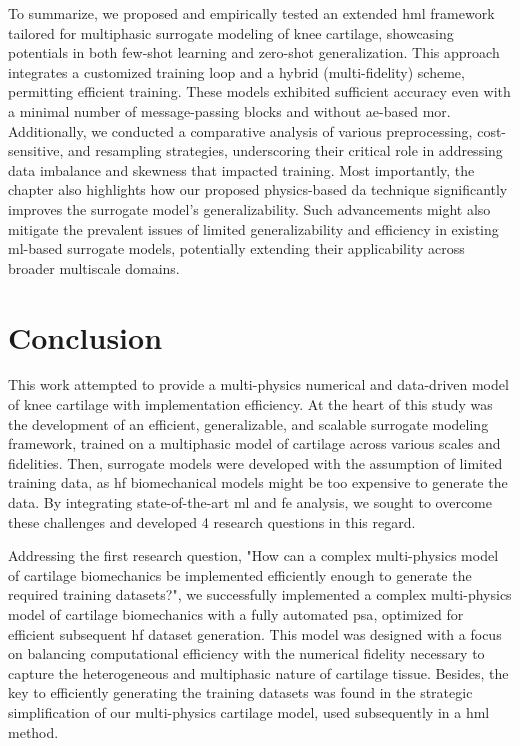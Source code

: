 \documentclass[12pt,a4paper]{report}
\begin{document}
To summarize, we proposed and empirically tested an extended \ac{hml} framework tailored for multiphasic surrogate modeling of knee cartilage, showcasing potentials in both few-shot learning and zero-shot generalization. This approach integrates a customized training loop and a hybrid (multi-fidelity) scheme, permitting efficient training. These models exhibited sufficient accuracy even with a minimal number of message-passing blocks and without \ac{ae}-based \ac{mor}. Additionally, we conducted a comparative analysis of various preprocessing, cost-sensitive, and resampling strategies, underscoring their critical role in addressing data imbalance and skewness that impacted training. Most importantly, the chapter also highlights how our proposed physics-based \ac{da} technique significantly improves the surrogate model's generalizability. Such advancements might also mitigate the prevalent issues of limited generalizability and efficiency in existing \ac{ml}-based surrogate models, potentially extending their applicability across broader multiscale domains.

\chapter{Conclusion}
%
This work attempted to provide a multi-physics numerical and data-driven model of knee cartilage with implementation efficiency. At the heart of this study was the development of an efficient, generalizable, and scalable surrogate modeling framework, trained on a multiphasic model of cartilage across various scales and fidelities. Then, surrogate models were developed with the assumption of limited training data, as \ac{hf} biomechanical models might be too expensive to generate the data. By integrating state-of-the-art \ac{ml} and \ac{fe} analysis, we sought to overcome these challenges and developed 4 research questions in this regard.

Addressing the first research question, "How can a complex multi-physics model of cartilage biomechanics be implemented efficiently enough to generate the required training datasets?", we successfully implemented a complex multi-physics model of cartilage biomechanics with a fully automated \ac{psa}, optimized for efficient subsequent \ac{hf} dataset generation. This model was designed with a focus on balancing computational efficiency with the numerical fidelity necessary to capture the heterogeneous and multiphasic nature of cartilage tissue. Besides, the key to efficiently generating the training datasets was found in the strategic simplification of our multi-physics cartilage model, used subsequently in a \ac{hml} method.
\end{document}
